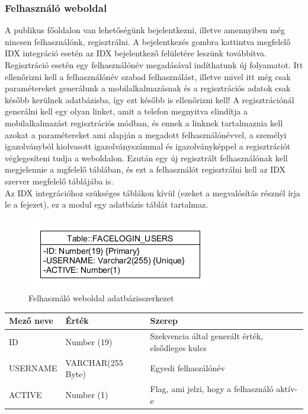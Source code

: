 \subsubsection{Felhasználó weboldal}
A publikus főoldalon van lehetőségünk bejelentkezni, illetve amennyiben még nincsen felhasználónk, regisztrálni. A bejelentkezés gombra kattintva megfelelő IDX integráció esetén az IDX bejelentkező felületére leszünk továbbítva. Regisztráció esetén egy felhasználónév megadásával indíthatunk új folyamatot. Itt ellenőrizni kell a felhasználónév szabad felhasználást, illetve mivel itt még csak paramétereket generálunk a mobilalkalmazásnak és a regisztrációs adatok csak később kerülnek adatbázisba, így ezt később is ellenőrizni kell! A regisztrációnál generálni kell egy olyan linket, amit a telefon megnyitva elindítja a mobilalkalmazást regisztrációs módban, és ennek a linknek tartalmaznia kell azokat a paramétereket ami alapján a megadott felhasználónévvel, a személyi igazolványból kiolvasott igazolványszámmal és igazolványképpel a regisztrációt véglegesíteni tudja a weboldalon.
Ezután egy új regisztrált felhasználónak kell megjelennie a mgfelelő táblában, és ezt a felhasználót regisztrálni kell az IDX szerver megfelelő táblájába is.
\\Az IDX integrációhoz szükséges táblákon kívül (ezeket a megvalósítás résznél írja le a fejezet), ez a modul egy adatbázis táblát tartalmaz.

\begin{figure}[h]
 \begin{minipage}{1\textwidth} 
\centering
    \includegraphics[scale=0.7]{img/facelogin_db}
    \caption{Felhasználó weboldal adatbázisszerkezet}
 \end{minipage}
\end{figure}


	\begin{tabular}{|p{4cm}|p{3cm} |p{4cm}|}
   	\hline
	\textbf{Mező neve} & \textbf{Érték} & \textbf{Szerep}\\ \hline
	ID & Number (19) & Szekvencia által generált érték, elsődleges kulcs \\ \hline
	USERNAME & VARCHAR(255 Byte) & Egyedi felhaszálónév  \\ \hline
	ACTIVE & Number (1) & Flag, ami jelzi, hogy a felhasználó aktív-e \\ \hline
	\end{tabular}

